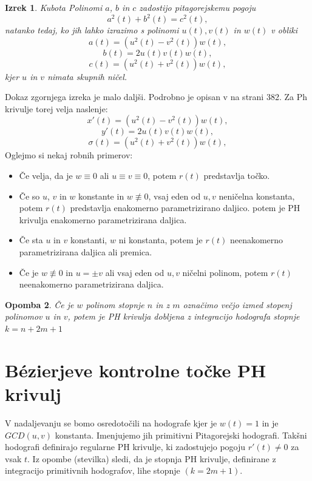 \documentclass[12pt]{article}
\newtheorem{Izrek}{{\sc Izrek}}[section]
\newtheorem{Opomba}[Izrek]{{\sc Opomba}}
\begin{document}
\begin{Izrek}{Kubota}\newline
	Polinomi $a$, $b$ in $c$ zadostijo pitagorejskemu pogoju
	$$a^2(t) + b^2(t) = c^2(t),$$
	natanko tedaj, ko jih lahko izrazimo s polinomi $u(t), v(t)$ in $w(t)$ v obliki
	$$a(t) = (u^2(t) - v^2(t))w(t),$$
	$$b(t) = 2u(t)v(t)w(t),$$
	$$c(t) = (u^2(t) + v^2(t))w(t),$$
	kjer $u$ in $v$ nimata skupnih ničel.
\end{Izrek}
Dokaz zgornjega izreka je malo daljši. Podrobno je opisan v  \cite{knjiga} na strani 382.
Za Ph krivulje torej velja naslenje:
$$x'(t) = (u^2(t) - v^2(t))w(t),$$
$$y'(t) = 2u(t)v(t)w(t),$$
$$\sigma(t) = (u^2(t) + v^2(t))w(t),$$
Oglejmo si nekaj robnih primerov:
\begin{itemize}
	\item Če velja, da je $w\equiv0$ ali $u\equiv v \equiv 0$, potem $r(t)$ predstavlja točko.
	\item Če so $u$, $v$ in $w$ konstante in $w \not\equiv 0$, vsaj eden od $u, v$ neničelna konstanta, potem $r(t)$ predstavlja enakomerno parametrizirano daljico.
	potem je PH krivulja enakomerno parametrizirana daljica.
	\item Če sta $u$ in $v$ konstanti, $w$  ni konstanta, potem je  $r(t)$ neenakomerno parametrizirana daljica ali premica.
	\item Če je $w \not\equiv 0$ in $u = \pm v$ ali vsaj eden od $u, v$ ničelni polinom, 
	potem $r(t)$ neenakomerno parametrizirana daljica.
\end{itemize}
\begin{Opomba}
	Če je $w$ polinom stopnje $n$ in z $m$ označimo večjo izmed stopenj polinomov $u$ in $v$, 
potem je PH krivulja dobljena z integracijo hodografa stopnje $k = n + 2m + 1$
\end{Opomba}

\section{B\'ezierjeve kontrolne točke PH krivulj}
V nadaljevanju se bomo osredotočili na hodografe kjer je $w(t) = 1$ in je $GCD(u,v)$ konstanta.
Imenjujemo jih primitivni Pitagorejski hodografi. 
Takšni hodografi definirajo regularne PH krivulje, ki zadostujejo pogoju $r'(t) \neq 0$ za vsak $t$. 
Iz opombe (stevilka) sledi, da je stopnja PH krivulje, definirane z integracijo
primitivnih hodografov, lihe stopnje $(k = 2m + 1)$.
\end{document}
